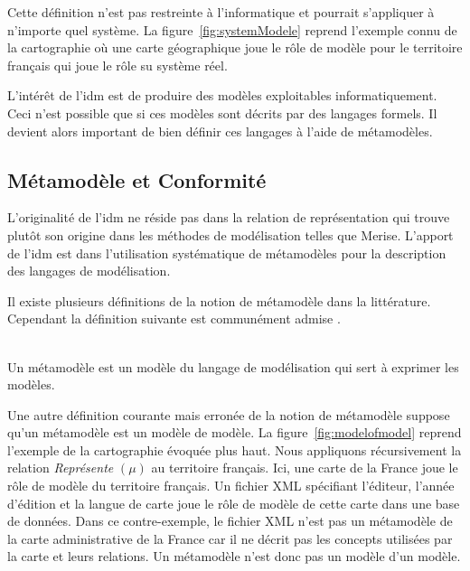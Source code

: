Cette définition n'est pas restreinte à l'informatique et pourrait s'appliquer à 
n'importe quel système. 
La figure~\ref{fig:systemModele} reprend l'exemple connu de la cartographie où 
une carte géographique joue le rôle de modèle pour le territoire français qui joue le rôle su système réel.

L'intérêt de l'\gls{idm} est de produire des modèles exploitables informatiquement. 
Ceci n'est possible que si ces modèles sont décrits par des langages formels. Il 
devient alors important de bien définir ces langages à l'aide de métamodèles.

\subsection{Métamodèle et Conformité}
L'originalité de l'\gls{idm} ne réside pas dans la relation de représentation qui 
trouve plutôt son origine dans les méthodes de modélisation telles que Merise. L'apport de l'\gls{idm} est dans l'utilisation systématique de métamodèles pour la description des langages de modélisation. 

Il existe plusieurs définitions de la notion de métamodèle dans la littérature. 
Cependant la définition suivante est communément admise \cite{bezivin2004rapport}.
\\\

\begin{definition}
Un métamodèle est un modèle du langage de modélisation qui sert à exprimer les 
modèles.
\end{definition}

Une autre définition courante mais erronée de la notion de métamodèle suppose
qu'un métamodèle est un modèle de modèle. La figure~\ref{fig:modelofmodel}
reprend l'exemple de la cartographie évoquée plus haut. Nous appliquons
récursivement la relation \textit{Représente} $(\mu)$ au territoire français.
Ici, une carte de la France joue le rôle de modèle du territoire français. Un
fichier XML spécifiant l'éditeur, l'année d'édition et la langue de carte joue
le rôle de modèle de cette carte dans une base de données. Dans ce
contre-exemple, le fichier XML n'est pas un métamodèle de la carte administrative de la France
car il ne décrit pas les concepts utilisées par la carte et leurs relations. Un
métamodèle n'est donc pas un modèle d'un modèle.

